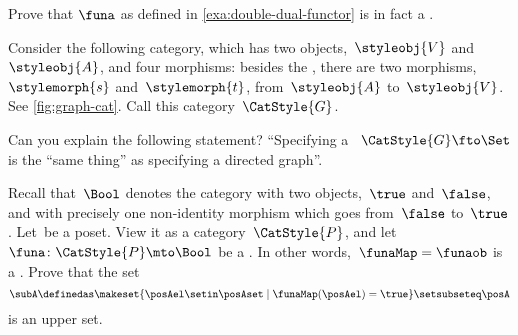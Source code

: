 \begin{gradedexercise}
    \label{ex:DoubleDualFunctor}
    Prove that $\funa$ as defined in \cref{exa:double-dual-functor} is in fact a .
\end{gradedexercise}

\begin{gradedexercise}
    \label{ex:GraphsViaFunctors}
    Consider the following category, which has two objects,~$\styleobj{V}$ and~$\styleobj{A}$, and four morphisms: besides the , there are two morphisms,~$\stylemorph{s}$ and~$\stylemorph{t}$, from~$\styleobj{A}$ to~$\styleobj{V}$.
    See \cref{fig:graph-cat}.
    Call this category~$\CatStyle{G}$.

    Can you explain the following statement?
    ``Specifying a ~$\CatStyle{G} \fto \Set$ is the ``same thing'' as specifying a directed graph''.
\end{gradedexercise}

\begin{marginfigure}
    \centering
    \caption{}
    \label{fig:graph-cat}
\end{marginfigure}

\begin{gradedexercise}
    \label{ex:UpperSetsViaFunctors}
    Recall that~$\Bool$ denotes the category with two objects,~$\true$ and~$\false$, and with precisely one non-identity morphism which goes from~$\false$ to~$\true$.
    Let~\posA be a poset.
    View it as a category~$\CatStyle{P}$, and let~$\funa \colon \CatStyle{P} \mto \Bool$ be a .
    In other words,~$\funaMap = \funaob$ is a .
    Prove that the set
    \begin{equation}
        \subA \definedas \makeset{ \posAel \setin \posAset \mid \funaMap(\posAel) = \true } \setsubseteq \posA
    \end{equation}
    is an upper set.
\end{gradedexercise}

